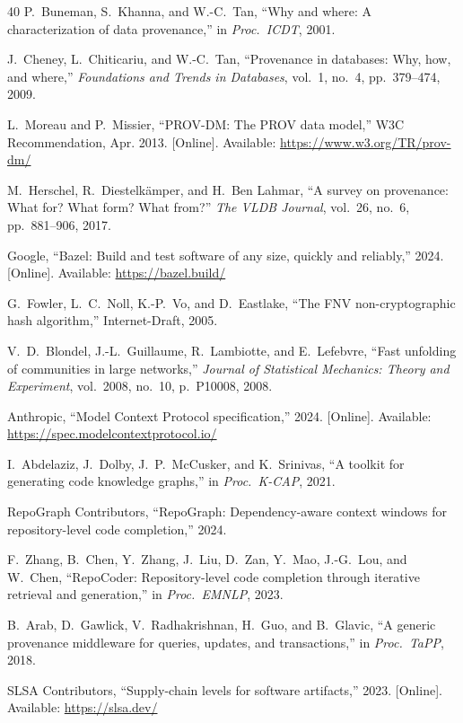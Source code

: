 \documentclass[conference]{IEEEtran}
\begin{document}
\begin{thebibliography}{40}
P.~Buneman, S.~Khanna, and W.-C.~Tan, ``Why and where: A
characterization of data provenance,'' in \emph{Proc.\ ICDT}, 2001.

J.~Cheney, L.~Chiticariu, and W.-C.~Tan, ``Provenance in databases:
Why, how, and where,'' \emph{Foundations and Trends in Databases},
vol.~1, no.~4, pp.~379--474, 2009.

L.~Moreau and P.~Missier, ``PROV-DM: The PROV data model,'' W3C
Recommendation, Apr. 2013. [Online]. Available:
\url{https://www.w3.org/TR/prov-dm/}

M.~Herschel, R.~Diestelk\"{a}mper, and H.~Ben Lahmar, ``A survey on
provenance: What for? What form? What from?'' \emph{The VLDB Journal},
vol.~26, no.~6, pp.~881--906, 2017.

Google, ``Bazel: Build and test software of any size, quickly and
reliably,'' 2024. [Online]. Available: \url{https://bazel.build/}

G.~Fowler, L.~C.~Noll, K.-P.~Vo, and D.~Eastlake, ``The FNV
non-cryptographic hash algorithm,'' Internet-Draft, 2005.

V.~D.~Blondel, J.-L.~Guillaume, R.~Lambiotte, and E.~Lefebvre, ``Fast
unfolding of communities in large networks,'' \emph{Journal of
Statistical Mechanics: Theory and Experiment}, vol.~2008, no.~10,
p.~P10008, 2008.

Anthropic, ``Model Context Protocol specification,'' 2024. [Online].
Available: \url{https://spec.modelcontextprotocol.io/}

I.~Abdelaziz, J.~Dolby, J.~P.~McCusker, and K.~Srinivas,
``A toolkit for generating code knowledge graphs,'' in \emph{Proc.\
K-CAP}, 2021.

RepoGraph Contributors, ``RepoGraph: Dependency-aware context windows
for repository-level code completion,'' 2024.

F.~Zhang, B.~Chen, Y.~Zhang, J.~Liu, D.~Zan, Y.~Mao, J.-G.~Lou,
and W.~Chen, ``RepoCoder: Repository-level code completion through
iterative retrieval and generation,'' in \emph{Proc.\ EMNLP}, 2023.

B.~Arab, D.~Gawlick, V.~Radhakrishnan, H.~Guo, and B.~Glavic,
``A generic provenance middleware for queries, updates, and
transactions,'' in \emph{Proc.\ TaPP}, 2018.

SLSA Contributors, ``Supply-chain levels for software artifacts,''
2023. [Online]. Available: \url{https://slsa.dev/}


\end{thebibliography}
\end{document}
